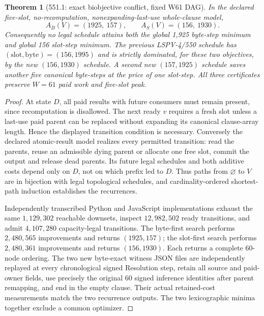 \documentclass[11pt]{article}
\newtheorem{theorem}{Theorem}
\begin{document}
\begin{theorem}[551.1: exact biobjective conflict, fixed W61 DAG]
In the declared five-slot, no-recomputation, nonexpanding-last-use whole-clause model,
\[
\boxed{A_B(V)=(1925,\ 157),\qquad A_S(V)=(156,\ 1930).}
\]
Consequently no legal schedule attains \emph{both} the global 1,925 byte-step minimum and global 156 slot-step minimum. The previous LSPV-4/550 schedule has $(\mathrm{slot},\mathrm{byte})=(156,1995)$ and is strictly dominated, for these two objectives, by the new $(156,1930)$ schedule. A second new $(157,1925)$ schedule saves another five canonical byte-steps at the price of one slot-step. All three certificates preserve $W=61$ paid work and five-slot peak.
\end{theorem}
\begin{proof}
At state $D$, all paid results with future consumers must remain present, since recomputation is disallowed. The next ready $v$ requires a fresh slot unless a last-use paid parent can be replaced without expanding its canonical clause-array length. Hence the displayed transition condition is necessary. Conversely the declared atomic-result model realizes every permitted transition: read the parents, reuse an admissible dying parent or allocate one free slot, commit the output and release dead parents. Its future legal schedules and both additive costs depend only on $D$, not on which prefix led to $D$. Thus paths from $\varnothing$ to $V$ are in bijection with legal topological schedules, and cardinality-ordered shortest-path induction establishes the recurrences.

Independently transcribed Python and JavaScript implementations exhaust the same $1{,}129{,}302$ reachable downsets, inspect $12{,}982{,}502$ ready transitions, and admit $4{,}107{,}280$ capacity-legal transitions. The byte-first search performs $2{,}480{,}565$ improvements and returns $(1925,157)$; the slot-first search performs $2{,}480{,}361$ improvements and returns $(156,1930)$. Each returns a complete 60-node ordering. The two new byte-exact witness JSON files are independently replayed at every chronological signed Resolution step, retain all source and paid-owner fields, use precisely the original 60 signed inference identities after parent remapping, and end in the empty clause. Their actual retained-cost measurements match the two recurrence outputs. The two lexicographic minima together exclude a common optimizer. \qedhere
\end{proof}
\end{document}
